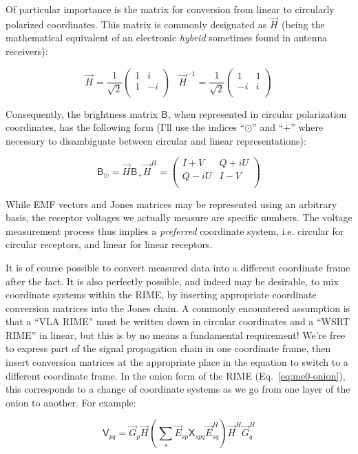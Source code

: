 \documentclass[referee]{aa}
\newcommand{\matrixtt}[4]{\left( \begin{array}{cc}#1&#2\\#3&#4\\\end{array} \right)}
\newcommand{\herm}{H}
\newcommand{\jones}[2]{\vec {#1}_{#2}}
\newcommand{\jonesinv}[2]{\vec {#1}^{-1}_{#2}}
\newcommand{\jonesT}[2]{\vec {#1}^{\herm}_{#2}}
\newcommand{\coh}[2]{\mathsf{{#1}}_{{#2}}}
\begin{document}
Of particular importance is the matrix for conversion from linear to circularly polarized coordinates. This matrix is commonly designated as $\jones{H}{}$ (being the mathematical equivalent of an electronic {\em hybrid} sometimes found in antenna receivers):

\[
\jones{H}{} = \frac{1}{\sqrt{2}} \matrixtt{1}{i}{1}{-i} \;\;\; \jonesinv{H}{} = \frac{1}{\sqrt{2}} \matrixtt{1}{1}{-i}{i}
\]

Consequently, the brightness matrix $\coh{B}{}$, when represented in circular polarization coordinates, has the following form (I'll use the indices ``$\odot$'' and ``$+$'' where necessary to disambiguate between circular and linear representations):

\[
\coh{B}{\odot} = \jones{H}{} \coh{B}{+} \jonesT{H}{} = \matrixtt{I+V}{Q+iU}{Q-iU}{I-V}
\]

While EMF vectors and Jones matrices may be represented using an arbitrary basis, the receptor voltages we actually measure are specific numbers. The voltage measurement process thus implies a {\em preferred} coordinate system, i.e. circular for circular receptors, and linear for linear receptors. 

It is of course possible to convert measured data into a different coordinate frame after the fact. It is also perfectly possible, and indeed may be desirable, to mix coordinate systems within the RIME, by inserting appropriate coordinate conversion matrices into the Jones chain. A commonly encountered assumption is that a ``VLA RIME'' must be written down in circular coordinates and a ``WSRT RIME'' in linear, but this is by no means a fundamental requirement! We're free to express part of the signal propagation chain in one coordinate frame, then insert conversion matrices at the appropriate place in the equation to switch to a different coordinate frame. In the onion form of the RIME (Eq.~\ref{eq:me0-onion}), this corresponds to a change of coordinate systems as we go from one layer of the onion to another. For example:

\[
\coh{V}{pq} = \jones{G}{p} \jones{H}{} \left ( \sum_{s} \jones{E}{sp} \coh{X}{spq} 
\jonesT{E}{sq} \right ) \jonesT{H}{} \jonesT{G}{q}
\] 
\end{document}
